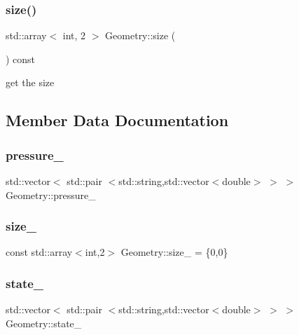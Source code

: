 \subsubsection{\texorpdfstring{size()}{size()}}
{\footnotesize\ttfamily std\+::array$<$ int, 2 $>$ Geometry\+::size (\begin{DoxyParamCaption}{ }\end{DoxyParamCaption}) const}



get the size 



\subsection{Member Data Documentation}
\mbox{\label{classGeometry_a830ddf5cb2bc1a98eeee35070a993ada}} 
\subsubsection{\texorpdfstring{pressure\_}{pressure\_}}
{\footnotesize\ttfamily std\+::vector$<$ std\+::pair $<$std\+::string,std\+::vector$<$double$>$ $>$ $>$ Geometry\+::pressure\+\_\+}

\mbox{\label{classGeometry_a29ceea52d69af78e36af1e74b68a8be4}} 
\subsubsection{\texorpdfstring{size\_}{size\_}}
{\footnotesize\ttfamily const std\+::array$<$int,2$>$ Geometry\+::size\+\_\+ = \{0,0\}}

\mbox{\label{classGeometry_a47ef00ea9a3316bc5a8120bea51b32ed}} 
\subsubsection{\texorpdfstring{state\_}{state\_}}
{\footnotesize\ttfamily std\+::vector$<$ std\+::pair $<$std\+::string,std\+::vector$<$double$>$ $>$ $>$ Geometry\+::state\+\_\+}

\mbox{\label{classGeometry_a69d0315868408c48a8ee5d02a06cdfe2}} 
